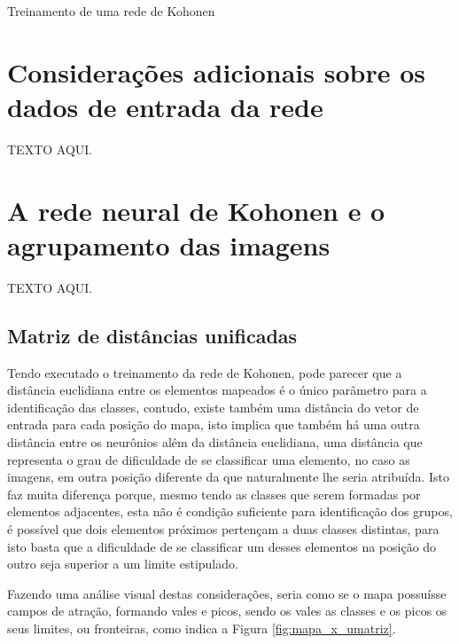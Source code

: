 \begin{algorithm}[H]
\caption{Treinamento de uma rede de Kohonen}\label{alg:trei_khn}
\end{algorithm}

\section{Considerações adicionais sobre os dados de entrada da rede}\label{sec:entrada_rede}

TEXTO AQUI.

\section{A rede neural de Kohonen e o agrupamento das imagens}\label{sec:rede_kohonen_imagens}

TEXTO AQUI.

\subsection{Matriz de distâncias unificadas}\label{sec:u_matriz}

Tendo executado o treinamento da rede de Kohonen, pode parecer que a distância
euclidiana entre os elementos mapeados é o único parâmetro para a identificação
das classes, contudo, existe também uma distância do vetor de entrada para cada
posição do mapa, isto implica que também há uma outra distância entre os
neurônios além da distância euclidiana, uma distância que representa o grau de
dificuldade de se classificar uma elemento, no caso as imagens, em outra posição
diferente da que naturalmente lhe seria atribuída. Isto faz muita diferença
porque, mesmo tendo as classes que serem formadas por elementos adjacentes, esta
não é condição suficiente para identificação dos grupos, é possível que
dois elementos próximos pertençam a duas classes distintas, para isto basta
que a dificuldade de se classificar um desses elementos na posição do outro seja
superior a um limite estipulado.

Fazendo uma análise visual destas considerações, seria como se o mapa possuísse
campos de atração, formando vales e picos, sendo os vales as classes e os picos
os seus limites, ou fronteiras, como indica a Figura \ref{fig:mapa_x_umatriz}.

